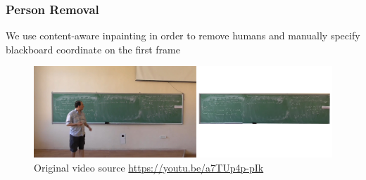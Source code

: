 \begin{frame}
  \frametitle{Person Removal}

  We use content-aware inpainting in order to remove humans
  and manually specify blackboard coordinate on the first frame

  \begin{figure}[h]
    \includegraphics[width=\linewidth]{images/board-comparison}
    \centering
    \caption{Original video source \url{https://youtu.be/a7TUp4p-pIk}}
  \end{figure}

\end{frame}
